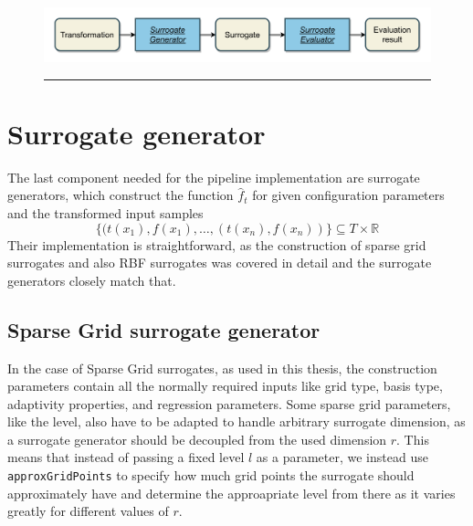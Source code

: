 \documentclass[
  a4paper,  %
  twoside,  %
  bibliography=totoc,
  headsepline,
  cleardoublepage=empty,
  parskip=half,
  draft=false
]{scrbook}
\newcommand{\delimit}{{\color{charcoal}\noindent\rule{\textwidth}{1pt}}}
\begin{document}
\newpage
\begin{mdframed}[style=style,frametitle={Transformation evaluator (forward looking)}]
\begin{figure}[H]
\includegraphics[width=\textwidth]{graphics/TransformationEval.pdf}
\delimit

\label{fig:te}
\end{figure}
\end{mdframed}

\section {Surrogate generator}

The last component needed for the pipeline implementation are surrogate generators, which construct the function $\hat{f}_t$ for given configuration parameters and the transformed input samples
\begin{equation}
\{(t(x_1), f(x_1), \dots, (t(x_n), f(x_n))\} \subseteq T \times \mathds{R}
\end{equation}
Their implementation is straightforward, as the construction of sparse grid surrogates and also RBF surrogates was covered in detail and the surrogate generators closely match that.


\subsection {Sparse Grid surrogate generator}

In the case of Sparse Grid surrogates, as used in this thesis, the construction parameters contain all the normally required inputs like grid type, basis type, adaptivity properties, and regression parameters.
Some sparse grid parameters, like the level, also have to be adapted to handle arbitrary surrogate dimension, as a surrogate generator should be decoupled from the used dimension $r$. 
This means that instead of passing a fixed level $l$ as a parameter, we instead use \texttt{approxGridPoints} to specify how much grid points the surrogate should approximately have and determine the approapriate level from there as it varies greatly for different values of $r$.
\end{document}

